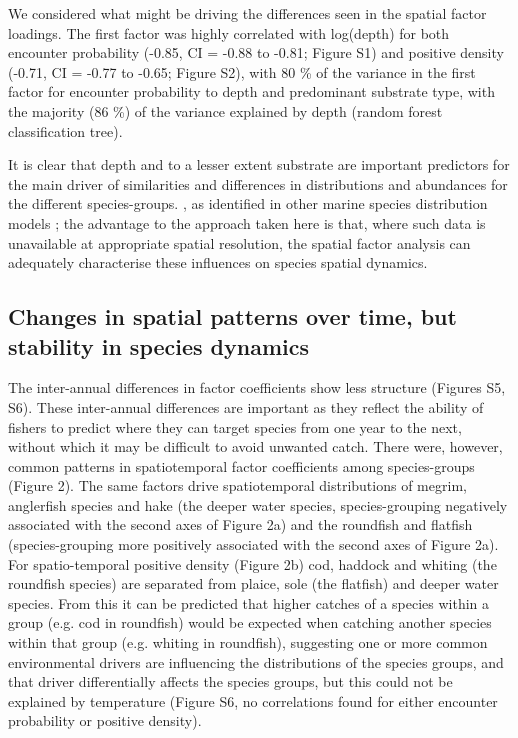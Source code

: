 \documentclass{nature}
\begin{document}
 We considered what might be driving the differences seen
in the spatial factor loadings. The first factor was highly correlated with
log(depth) for both encounter probability (-0.85, CI = -0.88 to -0.81; Figure
S1) and positive density (-0.71, CI = -0.77 to -0.65; Figure S2),  with 80 \% of the variance
in the first factor for encounter probability to depth and predominant
substrate type, with the majority (86 \%) of the variance explained by depth
(random forest classification tree). 

It is clear that depth and to a lesser extent substrate are important
predictors for the main driver of similarities and differences in distributions
and abundances for the different species-groups. , as
identified in other marine species distribution models \cite{Robinson2011}; the
advantage to the approach taken here is that, where such data is unavailable at
appropriate spatial resolution, the spatial factor analysis can adequately
characterise these influences on species spatial dynamics.

\subsection{Changes in spatial patterns over time, but stability in species
	dynamics}  The inter-annual
differences in factor coefficients show less structure (Figures S5, S6). These
inter-annual differences are important as they reflect the ability of fishers
to predict where they can target species from one year to the next, without
which it may be difficult to avoid unwanted catch. There were, however,
 common patterns in
spatiotemporal factor coefficients among species-groups  (Figure 2).  The same factors  drive
spatiotemporal distributions of megrim, anglerfish species and hake (the deeper
water species, species-grouping negatively associated with the second axes of
Figure 2a) and the roundfish and flatfish (species-grouping more positively
associated with the second axes of Figure 2a). For spatio-temporal positive
density (Figure 2b) cod, haddock and whiting (the roundfish species) are
separated from plaice, sole (the flatfish) and deeper water species.  From this it can be predicted that higher catches of a species
within a group (e.g.  cod in roundfish) would be expected when catching another
species within that group (e.g. whiting in roundfish),  suggesting
 one or more common environmental drivers are influencing the
distributions of the species groups, and that driver differentially affects the
species groups, but this could not be explained by temperature  (Figure
S6, no correlations found for either encounter probability or positive
density).
\end{document}
